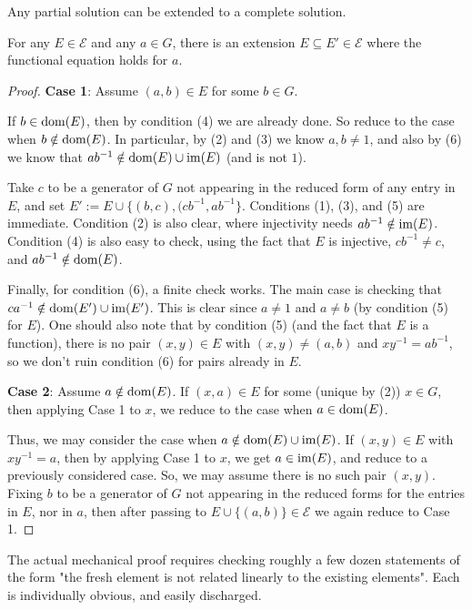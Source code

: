 Any partial solution can be extended to a complete solution.
\begin{lemma}\label{obelix-extend}
For any $E\in \mathscr{E}$ and any $a\in G$, there is an extension $E\subseteq E'\in \mathscr{E}$ where the functional equation holds for $a$.
\end{lemma}
\begin{proof}
{\bf Case 1}: Assume $(a,b)\in E$ for some $b\in G$.

If $b\in {\rm dom}(E)$, then by condition (4) we are already done.  So reduce to the case when $b\notin {\rm dom}(E)$.  In particular, by (2) and (3) we know $a,b\neq 1$, and also by (6) we know that $ab^{-1}\notin {\rm dom}(E)\cup{\rm im}(E)$ (and is not $1$).

Take $c$ to be a generator of $G$ not appearing in the reduced form of any entry in $E$, and set $E':=E\cup\{(b,c),(cb^{-1},ab^{-1}\}$.  Conditions (1), (3), and (5) are immediate.  Condition (2) is also clear, where injectivity needs $ab^{-1}\notin {\rm im}(E)$.   Condition (4) is also easy to check, using the fact that $E$ is injective, $cb^{-1}\neq c$, and $ab^{-1}\notin {\rm dom}(E)$.

Finally, for condition (6), a finite check works.  The main case is checking that $ca^{-1}\notin {\rm dom}(E')\cup {\rm im}(E')$.  This is clear since $a\neq 1$ and $a\neq b$ (by condition (5) for $E$).  One should also note that by condition (5) (and the fact that $E$ is a function), there is no pair $(x,y)\in E$ with $(x,y)\neq (a,b)$ and  $xy^{-1}=ab^{-1}$, so we don't ruin condition (6) for pairs already in $E$.

{\bf Case 2}: Assume $a\notin {\rm dom}(E)$.  If $(x,a)\in E$ for some (unique by (2)) $x\in G$, then applying Case 1 to $x$, we reduce to the case when $a\in {\rm dom}(E)$.

Thus, we may consider the case when $a\notin {\rm dom}(E)\cup {\rm im}(E)$.  If $(x,y)\in E$ with $xy^{-1}=a$, then by applying Case 1 to $x$, we get $a\in {\rm im}(E)$, and reduce to a previously considered case.  So, we may assume there is no such pair $(x,y)$.  Fixing $b$ to be a generator of $G$ not appearing in the reduced forms for the entries in $E$, nor in $a$, then after passing to $E\cup\{(a,b)\}\in \mathscr{E}$ we again reduce to Case 1.
\end{proof}
The actual mechanical proof requires checking roughly a few dozen statements of the form "the fresh
element is not related linearly to the existing elements". Each is individually obvious, and easily
discharged.

